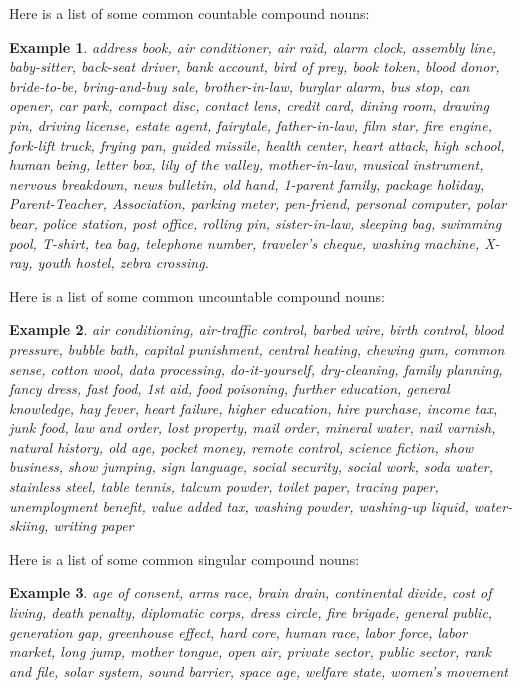 \documentclass[oneside]{book}
\numberwithin{equation}{section}
\newtheorem{example}{Example}[section]
\begin{document}
Here is a list of some common countable compound nouns:
\begin{example}
    address book, air conditioner, air raid, alarm clock, assembly line, baby-sitter, back-seat driver, bank account, bird of prey, book token, blood donor, bride-to-be, bring-and-buy sale, brother-in-law, burglar alarm, bus stop, can opener, car park, compact disc, contact lens, credit card, dining room, drawing pin, driving license, estate agent, fairytale, father-in-law, film star, fire engine, fork-lift truck, frying pan, guided missile, health center, heart attack, high school, human being, letter box, lily of the valley, mother-in-law, musical instrument, nervous breakdown, news bulletin, old hand, 1-parent family, package holiday, Parent-Teacher, Association, parking meter, pen-friend, personal computer, polar bear, police station, post office, rolling pin, sister-in-law, sleeping bag, swimming pool, T-shirt, tea bag, telephone number, traveler's cheque, washing machine, X-ray, youth hostel, zebra crossing.
\end{example}
%
\noindent{} Here is a list of some common uncountable compound nouns:
\begin{example}
    air conditioning, air-traffic control, barbed wire, birth control, blood pressure, bubble bath, capital punishment, central heating, chewing gum, common sense, cotton wool, data processing, do-it-yourself, dry-cleaning, family planning, fancy dress, fast food, 1st aid, food poisoning, further education, general knowledge, hay fever, heart failure, higher education, hire purchase, income tax, junk food, law and order, lost property, mail order, mineral water, nail varnish, natural history, old age, pocket money, remote control, science fiction, show business, show jumping, sign language, social security, social work, soda water, stainless steel, table tennis, talcum powder, toilet paper, tracing paper, unemployment benefit, value added tax, washing powder, washing-up liquid, water-skiing, writing paper
\end{example}
%
\noindent{} Here is a list of some common singular compound nouns:
\begin{example}
    age of consent, arms race, brain drain, continental divide, cost of living, death penalty, diplomatic corps, dress circle, fire brigade, general public, generation gap, greenhouse effect, hard core, human race, labor force, labor market, long jump, mother tongue, open air, private sector, public sector, rank and file, solar system, sound barrier, space age, welfare state, women's movement
\end{example}
\end{document}
